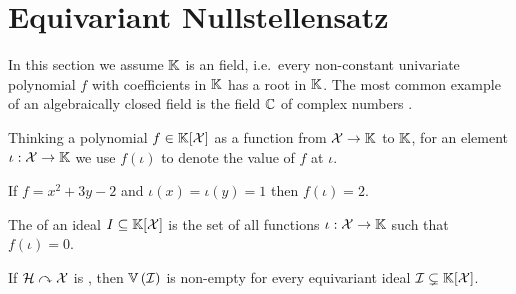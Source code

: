 %
\section{Equivariant Nullstellensatz}
%
In this section we assume $\mathbb{K}$ is an  field,
i.e.\ every non-constant univariate polynomial $f$ with coefficients in $\mathbb{K}$ has a root in $\mathbb{K}$.
The most common example of an algebraically closed field is the field $\mathbb{C}$ of complex numbers
\cite[Section 1.1, Theorem 7]{CLO15}.

Thinking a polynomial $f\in\mathbb{K}[\mathcal{X}]$ as a function from $\mathcal{X} \to \mathbb{K}$ to $\mathbb{K}$,
for an element $\iota : \mathcal{X} \to \mathbb{K}$ we use $f(\iota)$ to denote the value of $f$ at $\iota$.
%
\begin{example}\label{ex:inst}
    If $f = x^2 + 3y - 2$ and $\iota(x) = \iota(y) = 1$ then $f(\iota) = 2$.
\end{example}
%
\begin{definition}\label{def:variety}
    The  of an ideal $I\subseteq\mathbb{K}[\mathcal{X}]$ is the set of all functions $\iota : \mathcal{X} \to \mathbb{K}$ such that $f(\iota) = 0$.
\end{definition}
%
\begin{theorem}\label{thm:weak null}
    If $\mathcal{H}\curvearrowright\mathcal{X}$ is ,
    then $\zeros{\idl}$ is non-empty for every equivariant ideal $\idl \subsetneq \poly{\K}{\X}$.
\end{theorem}
%